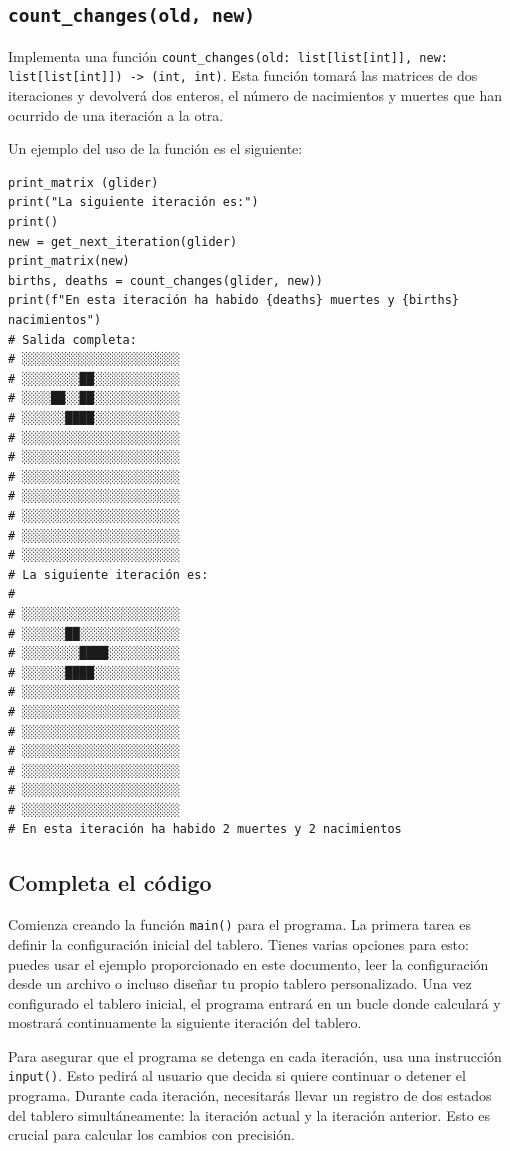 \documentclass[10pt,a4paper]{article}
\begin{document}
\subsection{\texttt{count\_changes(old, new)}}

Implementa una función \lstinline|count_changes(old: list[list[int]], new: list[list[int]]) -> (int, int)|. Esta función tomará las matrices de dos iteraciones y devolverá dos enteros, el número de nacimientos y muertes que han ocurrido de una iteración a la otra.

Un ejemplo del uso de la función es el siguiente:

\begin{lstlisting}
print_matrix (glider)
print("La siguiente iteración es:")
print()
new = get_next_iteration(glider)
print_matrix(new)
births, deaths = count_changes(glider, new))
print(f"En esta iteración ha habido {deaths} muertes y {births} nacimientos")
# Salida completa:
# ░░░░░░░░░░░░░░░░░░░░░░
# ░░░░░░░░██░░░░░░░░░░░░
# ░░░░██░░██░░░░░░░░░░░░
# ░░░░░░████░░░░░░░░░░░░
# ░░░░░░░░░░░░░░░░░░░░░░
# ░░░░░░░░░░░░░░░░░░░░░░
# ░░░░░░░░░░░░░░░░░░░░░░
# ░░░░░░░░░░░░░░░░░░░░░░
# ░░░░░░░░░░░░░░░░░░░░░░
# ░░░░░░░░░░░░░░░░░░░░░░
# ░░░░░░░░░░░░░░░░░░░░░░
# La siguiente iteración es:
# 
# ░░░░░░░░░░░░░░░░░░░░░░
# ░░░░░░██░░░░░░░░░░░░░░
# ░░░░░░░░████░░░░░░░░░░
# ░░░░░░████░░░░░░░░░░░░
# ░░░░░░░░░░░░░░░░░░░░░░
# ░░░░░░░░░░░░░░░░░░░░░░
# ░░░░░░░░░░░░░░░░░░░░░░
# ░░░░░░░░░░░░░░░░░░░░░░
# ░░░░░░░░░░░░░░░░░░░░░░
# ░░░░░░░░░░░░░░░░░░░░░░
# ░░░░░░░░░░░░░░░░░░░░░░
# En esta iteración ha habido 2 muertes y 2 nacimientos
\end{lstlisting}

\subsection{Completa el código}

Comienza creando la función \lstinline|main()| para el programa. La primera tarea es definir la configuración inicial del tablero. Tienes varias opciones para esto: puedes usar el ejemplo proporcionado en este documento, leer la configuración desde un archivo o incluso diseñar tu propio tablero personalizado. Una vez configurado el tablero inicial, el programa entrará en un bucle donde calculará y mostrará continuamente la siguiente iteración del tablero.

Para asegurar que el programa se detenga en cada iteración, usa una instrucción \lstinline|input()|. Esto pedirá al usuario que decida si quiere continuar o detener el programa. Durante cada iteración, necesitarás llevar un registro de dos estados del tablero simultáneamente: la iteración actual y la iteración anterior. Esto es crucial para calcular los cambios con precisión.
\end{document}
